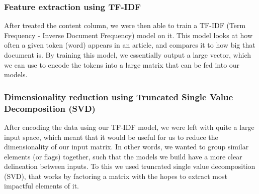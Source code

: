 \subsubsection{Feature extraction using TF-IDF}
After treated the content column, we were then able to train a TF-IDF (Term Frequency - Inverse Document Frequency)
model on it. This model looks at how often a given token (word) appears in an article, and compares it to how big that
document is. By training this model, we essentially output a large vector, which we can use to encode the tokens into a
large matrix that can be fed into our models.

\subsubsection{Dimensionality reduction using Truncated Single Value Decomposition (SVD)}
After encoding the data using our TF-IDF model, we were left with quite a large input space, which meant that it would
be useful for us to reduce the dimensionality of our input matrix. In other words, we wanted to group similar elements
(or flags) together, such that the models we build have a more clear delineation between inputs. To this we used
truncated single value decomposition (SVD), that works by factoring a matrix with the hopes to extract most impactful
elements of it.


